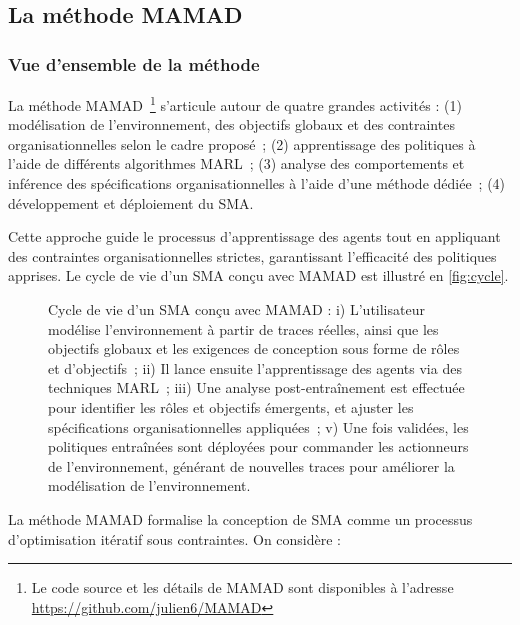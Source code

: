 \subsection{La méthode MAMAD}\label{sec:mamad}

\subsubsection{Vue d'ensemble de la méthode}

La méthode MAMAD~\footnote{Le code source et les détails de MAMAD sont disponibles à l'adresse \url{https://github.com/julien6/MAMAD}} s'articule autour de quatre grandes activités :
(1) modélisation de l'environnement, des objectifs globaux et des contraintes organisationnelles selon le cadre proposé~;
(2) apprentissage des politiques à l'aide de différents algorithmes MARL~;
(3) analyse des comportements et inférence des spécifications organisationnelles à l'aide d'une méthode dédiée~;
(4) développement et déploiement du SMA.

Cette approche guide le processus d'apprentissage des agents tout en appliquant des contraintes organisationnelles strictes, garantissant l'efficacité des politiques apprises. Le cycle de vie d'un SMA conçu avec MAMAD est illustré en \autoref{fig:cycle}.

\begin{figure}[h!]
    \centering
    
    \caption{Cycle de vie d'un SMA conçu avec MAMAD :
        i) L'utilisateur modélise l'environnement à partir de traces réelles, ainsi que les objectifs globaux et les exigences de conception sous forme de rôles et d'objectifs~;
        ii) Il lance ensuite l'apprentissage des agents via des techniques MARL~;
        iii) Une analyse post-entraînement est effectuée pour identifier les rôles et objectifs émergents, et ajuster les spécifications organisationnelles appliquées~;
        v) Une fois validées, les politiques entraînées sont déployées pour commander les actionneurs de l'environnement, générant de nouvelles traces pour améliorer la modélisation de l'environnement.
    }
    \label{fig:cycle}
\end{figure}

La méthode MAMAD formalise la conception de SMA comme un processus d'optimisation itératif sous contraintes. On considère :

